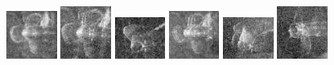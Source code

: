 \begin{figure}
    \includegraphics[width=0.15\textwidth]{chapters/images/dataset/all-class-images/propeler/propeler-100.jpg}
    \includegraphics[width=0.15\textwidth]{chapters/images/dataset/all-class-images/propeler/propeler-50.jpg}
    \includegraphics[width=0.15\textwidth]{chapters/images/dataset/all-class-images/propeler/propeler-134.jpg}
    \includegraphics[width=0.15\textwidth]{chapters/images/dataset/all-class-images/propeler/propeler-88.jpg}
    \includegraphics[width=0.15\textwidth]{chapters/images/dataset/all-class-images/propeler/propeler-117.jpg}
    \includegraphics[width=0.15\textwidth]{chapters/images/dataset/all-class-images/propeler/propeler-5.jpg}
    

\end{figure}
